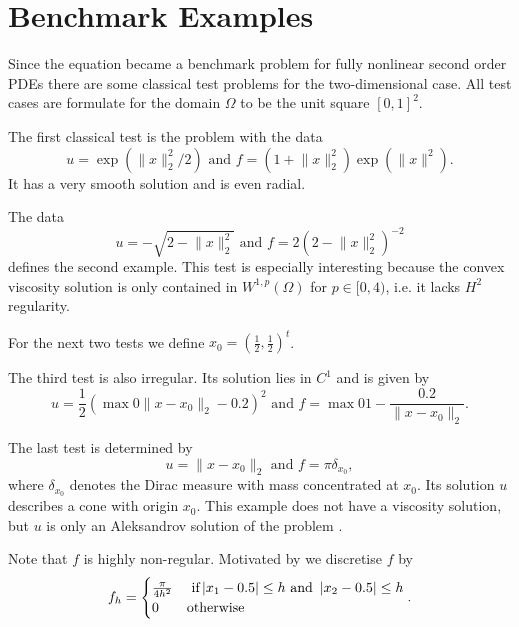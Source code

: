 \section{Benchmark Examples}

Since the \MA equation became a benchmark problem for fully nonlinear second order PDEs there are some classical test problems for the two-dimensional case. All test cases are formulate for the domain $\Omega$ to be the unit square $[0,1]^2$.

\begin{test} \label{test smooth}
The first classical \MA test is the problem with the data
\[
	u=\exp( \lVert x \rVert_2^2  /2) 
	\text { and } 
	f = (1 + \lVert x \rVert_2^2) \exp( \lVert x \rVert^2).
\]
It has a very smooth solution and is even radial.

\end{test}

\begin{test}\label{test sqrt}
The data
\[
	u = - \sqrt{ 2-  \lVert x \rVert_2^2}
	\text { and } 
	f = 2\left( 2-  \lVert x \rVert_2^2 \right)^{-2}
\]
defines the second example. This test is especially interesting because the convex viscosity solution is only contained in $W^{1,p}(\Omega) $ for $p \in [0,4)$\cite{DG2006a}, i.e. it lacks $H^2$ regularity.
\end{test}

For the next two tests we define $x_0 = \left(\frac 1 2, \frac 1 2  \right)^t$.

\begin{test}\label{test singularity}
The third \MA test is also irregular. Its solution lies in $C^1$ and is given by
\[
	u=\frac 1 2 \left( \max 0 {\lVert x - x_0 \rVert_2-0.2 }  \right)^2 
	\text { and } 
	f = \max 0 {1-\frac {0.2} {\lVert x - x_0 \rVert_2} }.
\]
\end{test}


\begin{test}\label{test dirac}
The last test is determined by
\[
	u = \lVert x - x_0 \rVert_2
	\text { and } 
	f = \pi \delta_{x_0},
\]
where $\delta_{x_0}$ denotes the Dirac measure with mass concentrated at $x_0$. Its solution $u$ describes a cone with origin $x_0$. This example does not have a viscosity solution, but $u$ is only an Aleksandrov solution of the problem \cite[Section 2.3.]{FO2011}.

Note that $f$ is highly non-regular. Motivated by \cite[Section 6.1.]{FO2011} we discretise $f$ by
\begin{align*}
	f_h = \begin{cases}
		\frac \pi {4h^2} & \text{ if} \left| x_1 - 0.5 \right| \leq h \text{ and } \left| x_2 - 0.5 \right| \leq h \\
		0	& \text{otherwise}
	\end{cases}.
\end{align*}
\end{test}


